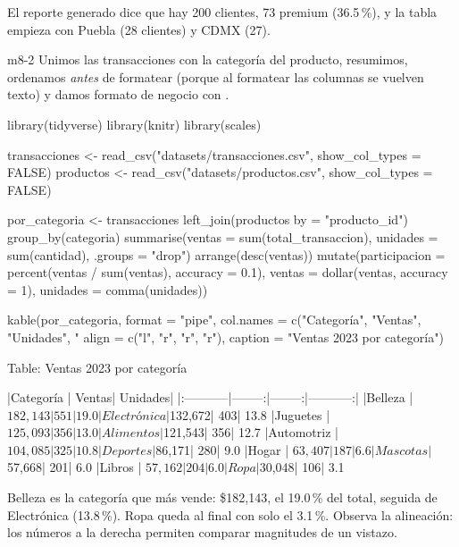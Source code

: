 El reporte generado dice que hay 200 clientes, 73 premium
(36.5\,\%), y la tabla empieza con Puebla (28 clientes) y CDMX (27).


\begin{solucion}{m8-2}
Unimos las transacciones con la categoría del producto, resumimos, ordenamos
\emph{antes} de formatear (porque al formatear las columnas se vuelven texto)
y damos formato de negocio con .
\end{solucion}

\begin{rcode}
library(tidyverse)
library(knitr)
library(scales)

transacciones <- read_csv("datasets/transacciones.csv",
                          show_col_types = FALSE)
productos <- read_csv("datasets/productos.csv", show_col_types = FALSE)

por_categoria <- transacciones %
  left_join(productos %
            by = "producto_id") %
  group_by(categoria) %
  summarise(ventas = sum(total_transaccion),
            unidades = sum(cantidad), .groups = "drop") %
  arrange(desc(ventas)) %
  mutate(participacion = percent(ventas / sum(ventas), accuracy = 0.1),
         ventas = dollar(ventas, accuracy = 1),
         unidades = comma(unidades))

kable(por_categoria, format = "pipe",
      col.names = c("Categoría", "Ventas", "Unidades", "%
      align = c("l", "r", "r", "r"),
      caption = "Ventas 2023 por categoría")
\end{rcode}
\begin{rsalida}

Table: Ventas 2023 por categoría

|Categoría   |   Ventas| Unidades| %
|:-----------|--------:|--------:|-----------:|
|Belleza     | $182,143|      551|       19.0%
|Electrónica | $132,672|      403|       13.8%
|Juguetes    | $125,093|      356|       13.0%
|Alimentos   | $121,543|      356|       12.7%
|Automotriz  | $104,085|      325|       10.8%
|Deportes    |  $86,171|      280|        9.0%
|Hogar       |  $63,407|      187|        6.6%
|Mascotas    |  $57,668|      201|        6.0%
|Libros      |  $57,162|      204|        6.0%
|Ropa        |  $30,048|      106|        3.1%
\end{rsalida}

Belleza es la categoría que más vende: \$182,143, el 19.0\,\% del total, seguida
de Electrónica (13.8\,\%). Ropa queda al final con solo el 3.1\,\%. Observa
la alineación: los números a la derecha permiten comparar magnitudes de un
vistazo.



